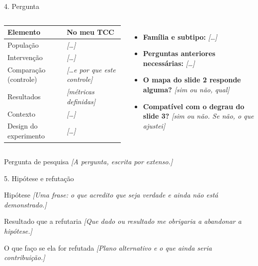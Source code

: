 \documentclass[aspectratio=169,11pt]{beamer}
\newcommand{\rotulo}[1]{\textcolor{maccent}{\small\bfseries #1}}
\newcommand{\preencher}[1]{\textcolor{mplace}{\textit{[#1]}}}
\begin{document}
\begin{frame}[t]{4. Pergunta}
  \begin{columns}[T]
      \footnotesize
      \renewcommand{\arraystretch}{1.2}
      \begin{tabularx}{\textwidth}{@{}l L@{}}
        \toprule
        \textcolor{mgray}{Elemento} & \textcolor{mgray}{No meu TCC} \\
        \midrule
        População & \preencher{\dots} \\
        Intervenção & \preencher{\dots} \\
        Comparação (controle) & \preencher{\dots e por que este controle} \\
        Resultados & \preencher{métricas definidas} \\
        Contexto & \preencher{\dots} \\
        Design do experimento & \preencher{\dots} \\
        \bottomrule
      \end{tabularx}
      \footnotesize
      \begin{itemize}
        \item \rotulo{Família e subtipo:} \preencher{\dots}
        \item \rotulo{Perguntas anteriores necessárias:} \preencher{\dots}
        \item \rotulo{O mapa do slide 2 responde alguma?} \preencher{sim ou não, qual}
        \item \rotulo{Compatível com o degrau do slide 3?} \preencher{sim ou não. Se não, o que ajustei}
      \end{itemize}
  \end{columns}

  \vspace{0cm}
  \begin{bloco}{Pergunta de pesquisa}
    \preencher{A pergunta, escrita por extenso.}
  \end{bloco}
\end{frame}

\begin{frame}[t]{5. Hipótese e refutação}
  \begin{bloco}{Hipótese}
    \preencher{Uma frase: o que acredito que seja verdade e ainda não está demonstrado.}
  \end{bloco}

  \begin{bloco}{Resultado que a refutaria}
    \preencher{Que dado ou resultado me obrigaria a abandonar a hipótese.}
  \end{bloco}

  \begin{bloco}{O que faço se ela for refutada}
    \preencher{Plano alternativo e o que ainda seria contribuição.}
  \end{bloco}
\end{frame}
\end{document}
